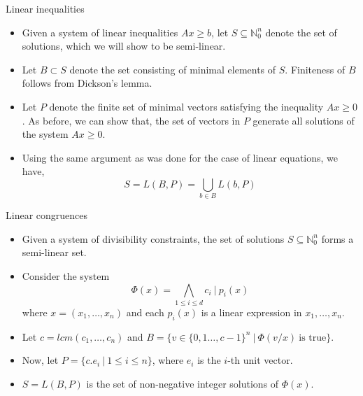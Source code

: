 \documentclass[10pt]{beamer}
\begin{document}
\begin{frame}{Linear inequalities}
    \begin{itemize}
    \item Given a system of linear inequalities $Ax\geq b$, let $S\subseteq \mathbb{N}_0^n$ denote the set of solutions,
    which we will show to be semi-linear.
    \item Let $B\subset S$ denote the set consisting of minimal elements of $S$. Finiteness of $B$ follows from 
    Dickson's lemma. 
    \item Let $P$ denote the finite set of minimal vectors satisfying the inequality $Ax\geq 0$. 
    As before, we can show that, the set of vectors in $P$ generate all solutions of the system $Ax\geq 0$.
    \item Using the same argument as was done for the case of linear equations, we have,
    \[ S=L(B,P)=\bigcup_{b\in B}L(b,P) \]
\end{itemize}
\end{frame}
\begin{frame}{Linear congruences}
    \begin{itemize}
    \item Given a system of divisibility constraints, the set of solutions $S\subseteq \mathbb{N}_0^n$ forms a semi-linear set.
    \item Consider the system 
     \[\Phi(x) = \bigwedge_{1\leq i\leq d} c_i\: |\: p_i(x)\]
     where $x=(x_1,\dots,x_n)$ and each 
     $p_i(x)$ is a linear expression in $x_1,\dots,x_n$.
    \item Let $c=lcm(c_1,\dots,c_n)$ 
    and $B=\{v\in \{0,1\dots,c-1\}^n\:|\:\Phi(v/x)\: \text{is true}\}$.
    \item Now, let $P=\{c.e_i\:|\:1\leq i\leq n\}$, where $e_i$ is the $i$-th unit vector.
    \item $S=L(B,P)$ is the set of non-negative integer solutions of $\Phi(x)$.
    \end{itemize}
\end{frame}
\end{document}
